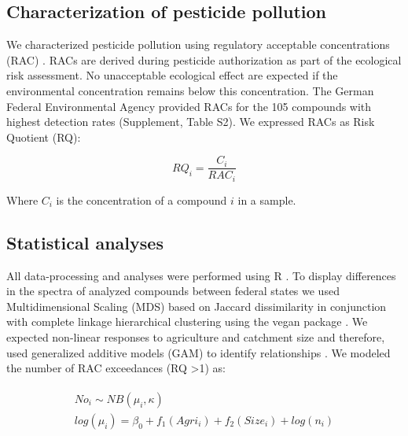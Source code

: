 \documentclass[journal=esthag,manuscript=article]{achemso}
\begin{document}
\subsection{Characterization of pesticide pollution}
We characterized pesticide pollution using regulatory acceptable concentrations (RAC) \citep{brock_linking_2010}.
RACs are derived during pesticide authorization as part of the ecological risk assessment.
No unacceptable ecological effect are expected if the environmental concentration remains below this concentration.
The German Federal Environmental Agency provided RACs for the 105 compounds with highest detection rates (Supplement, Table S2). 
We expressed RACs as Risk Quotient (RQ):

\begin{equation}
RQ_i = \frac{C_i}{RAC_i}
\end{equation}

Where $C_i$ is the concentration of a compound $i$ in a sample.


\subsection{Statistical analyses}
All data-processing and analyses were performed using R \citep{r_core_team_r:_2016}.
To display differences in the spectra of analyzed compounds between federal states we used Multidimensional Scaling (MDS) based on Jaccard dissimilarity in conjunction with complete linkage hierarchical clustering using the vegan package \citep{oksanen_vegan:_2016}.
We expected non-linear responses to agriculture and catchment size and therefore, used generalized additive models (GAM) to identify relationships \citep{fewster_analysis_2000}.
We modeled the number of RAC exceedances (RQ \textgreater 1) as:

\begin{align}
\begin{split}
  No_i \sim NB(\mu_i, \kappa) \\
  log(\mu_i)= \beta_0 + f_1(Agri_i) + f_2(Size_i) + log(n_i) \\
\end{split}
\end{align}
\end{document}
